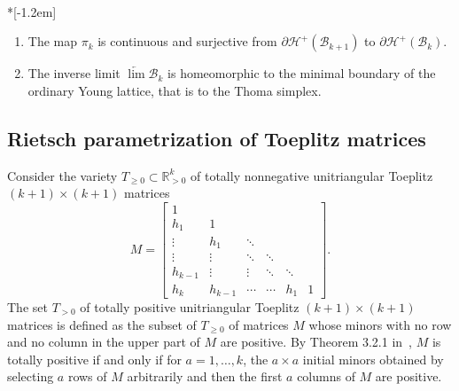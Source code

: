 \documentclass[ALCO,ThmDefs,Unicode,epreuves]{cedram}
\begin{document}
\begin{prop}\ \\*[-1.2em]
 

\begin{enumerate}
\item The map $\pi_{k}$ is continuous and surjective from $\partial
\mathcal{H}^{+}(\mathcal{B}_{k+1})$ to $\partial\mathcal{H}^{+}(\mathcal{B}%
_{k})$.

\item The inverse limit $\underleftarrow{\lim }\mathcal{B}_{k}$ is
homeomorphic to the minimal boundary of the ordinary Young lattice, that is to
the Thoma simplex.
\end{enumerate}
\end{prop}

\subsection{Rietsch parametrization of Toeplitz matrices}

Consider the variety $T_{\geq0}\subset\mathbb{R}_{>0}^{k}$ of totally
nonnegative unitriangular Toeplitz $(k+1)\times(k+1)$ matrices
\[
M=\left[
\begin{matrix}
1 & & & & & \\
h_{1} & 1 & & & & \\
\vdots & h_{1} & \ddots & & & \\
\vdots & \vdots & \ddots & \ddots & & \\
h_{k-1} & \vdots & \vdots & \ddots & \ddots & \\
h_{k} & h_{k-1} & \cdots & \cdots & h_{1} & 1
\end{matrix}
\right] .
\]
The set $T_{>0}$ of totally positive unitriangular Toeplitz $(k+1)\times(k+1)$
matrices is defined as the subset of $T_{\geq0}$ of matrices $M$ whose minors
with no row and no column in the upper part of $M$ are positive. By Theorem
3.2.1 in~\cite{BFZ}, $M$ is totally positive if and only if for $a=1,\ldots
,k$, the $a\times a$ initial minors obtained by selecting $a$ rows of $M$
arbitrarily and then the first $a$ columns of $M$ are positive.
\end{document}
